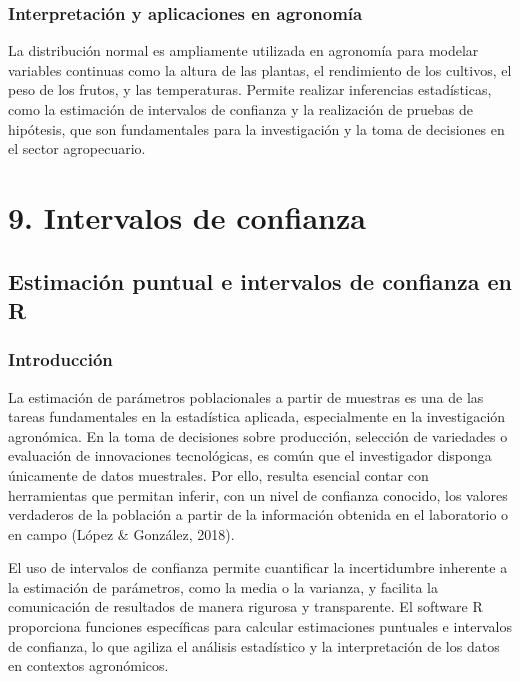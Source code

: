 \documentclass[
  spanish,
  letterpaper,
]{book}
\begin{document}
\section{Interpretación y aplicaciones en
agronomía}\label{interpretaciuxf3n-y-aplicaciones-en-agronomuxeda-1}

La distribución normal es ampliamente utilizada en agronomía para
modelar variables continuas como la altura de las plantas, el
rendimiento de los cultivos, el peso de los frutos, y las temperaturas.
Permite realizar inferencias estadísticas, como la estimación de
intervalos de confianza y la realización de pruebas de hipótesis, que
son fundamentales para la investigación y la toma de decisiones en el
sector agropecuario.

\part{9. Intervalos de confianza}


\chapter{Estimación puntual e intervalos de confianza en
R}\label{estimaciuxf3n-puntual-e-intervalos-de-confianza-en-r}

\section{Introducción}\label{introducciuxf3n-3}

La estimación de parámetros poblacionales a partir de muestras es una de
las tareas fundamentales en la estadística aplicada, especialmente en la
investigación agronómica. En la toma de decisiones sobre producción,
selección de variedades o evaluación de innovaciones tecnológicas, es
común que el investigador disponga únicamente de datos muestrales. Por
ello, resulta esencial contar con herramientas que permitan inferir, con
un nivel de confianza conocido, los valores verdaderos de la población a
partir de la información obtenida en el laboratorio o en campo (López \&
González, 2018).

El uso de intervalos de confianza permite cuantificar la incertidumbre
inherente a la estimación de parámetros, como la media o la varianza, y
facilita la comunicación de resultados de manera rigurosa y
transparente. El software R proporciona funciones específicas para
calcular estimaciones puntuales e intervalos de confianza, lo que
agiliza el análisis estadístico y la interpretación de los datos en
contextos agronómicos.
\end{document}

